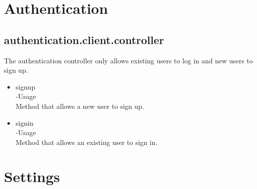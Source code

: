 \documentclass[a4paper,12pt]{article}
\begin{document}
\section{Authentication}
\subsection{authentication.client.controller}
The authentication controller only allows existing users to log in and new users to sign up.
 \begin{itemize}
 \item signup \\
 -Usage\\
 Method that allows a new user to sign up.
 \item signin\\
 -Usage\\
 Method that allows an existing user to sign in.
 \end{itemize}
 
 \section{Settings}
\end{document}
